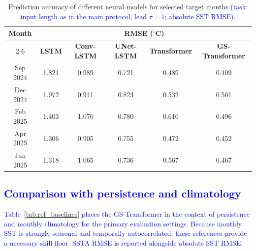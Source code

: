 \documentclass[published]{agujournal2025}
\newcommand{\rev}[1]{\textcolor{blue}{#1}}
\begin{document}
\begin{table}[h]
\caption{Prediction accuracy of different neural models for selected target months \rev{(task: input length as in the main protocol, lead $\tau=1$; absolute SST RMSE)}.}
\label{tab:monthly_skill}
\centering
\small
\renewcommand{\arraystretch}{1.8}
\begin{tabular}{cccccc}
\hline
\multirow{2}{*}{\textbf{Month}} & \multicolumn{5}{c}{\textbf{RMSE ($^\circ$C)}} \\ \cline{2-6}
 & \textbf{LSTM} & \textbf{Conv-LSTM} & \textbf{UNet-LSTM} & \textbf{Transformer} & \textbf{GS-Transformer} \\ \hline
Sep 2024 & 1.821 & 0.989 & 0.721 & 0.489 & 0.409 \\
Dec 2024 & 1.972 & 0.941 & 0.823 & 0.532 & 0.501 \\
Feb 2025 & 1.403 & 1.070 & 0.780 & 0.610 & 0.496 \\
Apr 2025 & 1.306 & 0.905 & 0.755 & 0.472 & 0.452 \\
Jun 2025 & 1.318 & 1.065 & 0.736 & 0.567 & 0.467 \\ \hline
\end{tabular}
\end{table}

\subsection{\rev{Comparison with persistence and climatology}}
\rev{Table~\ref{tab:ref_baselines} places the GS-Transformer in the context of persistence and monthly climatology for the primary evaluation settings. Because monthly SST is strongly seasonal and temporally autocorrelated, these references provide a necessary skill floor. SSTA RMSE is reported alongside absolute SST RMSE.}
\end{document}
